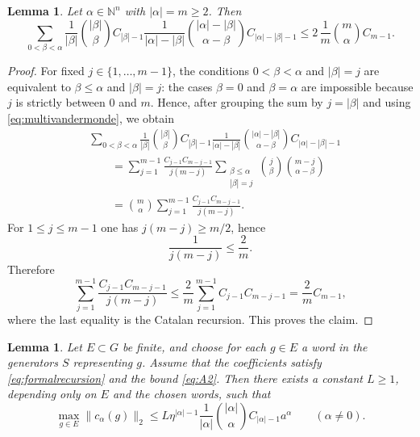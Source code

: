 \documentclass[12pt]{amsproc}
\theoremstyle{plain}
\newtheorem{lemma}[theorem]{Lemma}
\theoremstyle{definition}
\numberwithin{equation}{section}
\newcommand{\N}{\mathbb{N}}
\begin{document}
\begin{lemma}\label{lem:multicatalan}
Let $\alpha\in \N^n$ with $|\alpha|=m\ge 2$. Then
\[
\sum_{0<\beta<\alpha}
\frac{1}{|\beta|}\binom{|\beta|}{\beta}C_{|\beta|-1}
\frac{1}{|\alpha|-|\beta|}\binom{|\alpha|-|\beta|}{\alpha-\beta}C_{|\alpha|-|\beta|-1}
\le 2\,\frac{1}{m}\binom{m}{\alpha}C_{m-1}.
\]
\end{lemma}

\begin{proof}
For fixed $j\in\{1,\dots,m-1\}$, the conditions $0<\beta<\alpha$ and $|\beta|=j$ are equivalent to $\beta\le \alpha$ and $|\beta|=j$: the cases $\beta=0$ and $\beta=\alpha$ are impossible because $j$ is strictly between $0$ and $m$. Hence, after grouping the sum by $j=|\beta|$ and using \eqref{eq:multivandermonde}, we obtain
\begin{align*}
&\sum_{0<\beta<\alpha}
\frac{1}{|\beta|}\binom{|\beta|}{\beta}C_{|\beta|-1}
\frac{1}{|\alpha|-|\beta|}\binom{|\alpha|-|\beta|}{\alpha-\beta}C_{|\alpha|-|\beta|-1}
\\
&\qquad=
\sum_{j=1}^{m-1}
\frac{C_{j-1}C_{m-j-1}}{j(m-j)}
\sum_{\substack{\beta\le \alpha\\ |\beta|=j}}
\binom{j}{\beta}\binom{m-j}{\alpha-\beta}
\\
&\qquad=
\binom{m}{\alpha}
\sum_{j=1}^{m-1}\frac{C_{j-1}C_{m-j-1}}{j(m-j)}.
\end{align*}
For $1\le j\le m-1$ one has $j(m-j)\ge m/2$, hence
\[
\frac{1}{j(m-j)}\le \frac{2}{m}.
\]
Therefore
\[
\sum_{j=1}^{m-1}\frac{C_{j-1}C_{m-j-1}}{j(m-j)}
\le \frac{2}{m}\sum_{j=1}^{m-1}C_{j-1}C_{m-j-1}
=\frac{2}{m}C_{m-1},
\]
where the last equality is the Catalan recursion. This proves the claim.
\end{proof}

\begin{lemma}\label{lem:finitepropagation}
Let $E\subset G$ be finite, and choose for each $g\in E$ a word in the generators $S$ representing $g$. Assume that the coefficients satisfy \eqref{eq:formalrecursion} and the bound \eqref{eq:A2}. Then there exists a constant $L\ge 1$, depending only on $E$ and the chosen words, such that
\begin{equation}\label{eq:finitepropagation}
\max_{g\in E}\|c_\alpha(g)\|_2
\le L \eta^{|\alpha|-1}\frac{1}{|\alpha|}\binom{|\alpha|}{\alpha}C_{|\alpha|-1}a^\alpha
\qquad (\alpha\ne 0).
\end{equation}
\end{lemma}
\end{document}
